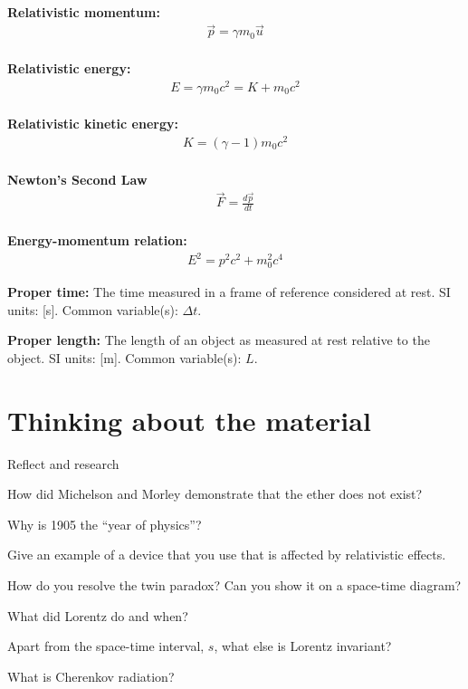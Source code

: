 \begin{importantEquations}
\begin{multicols}{2}
\\
\textbf{Relativistic momentum:}
\begin{align*}
\vec p = \gamma m_0 \vec u
\end{align*}
\\
\textbf{Relativistic energy:}
\begin{align*}
E = \gamma m_0 c^2 = K + m_0c^2
\end{align*}
\\
\textbf{Relativistic kinetic energy:}
\begin{align*}
K=(\gamma -1) m_0c^2
\end{align*}
\\
\textbf{Newton's Second Law}
\begin{align*}
\vec F = \frac{d\vec p }{dt}
\end{align*}
\\
\textbf{Energy-momentum relation:}
\begin{align*}
E^2 = p^2c^2 +m_0^2c^4
\end{align*}
\end{multicols}
\end{importantEquations}

\begin{definitions}
	\item \textbf{Proper time:} The time measured in a frame of reference considered at rest. SI units: [\si{s}]. Common variable(s): $\Delta t$.
	\item \textbf{Proper length:} The length of an object as measured at rest relative to the object. SI units: [\si{m}]. Common variable(s): $L$.
\end{definitions}

\section{Thinking about the material}

\begin{chapteractivity}{Reflect and research}
	{
	\item How did Michelson and Morley demonstrate that the ether does not exist? 
	\item Why is 1905 the ``year of physics''?
	\item Give an example of a device that you use that is affected by relativistic effects.
	\item How do you resolve the twin paradox? Can you show it on a space-time diagram?
	\item What did Lorentz do and when?
	\item Apart from the space-time interval, $s$, what else is Lorentz invariant?
	\item What is Cherenkov radiation?
	}
\end{chapteractivity}

